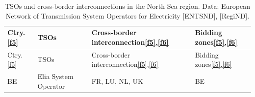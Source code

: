 \begin{longtable}[]{@{}llll@{}}
\caption{TSOs and cross-border interconnections in the North Sea region.
Data: European Network of Transmission System Operators for Electricity
{[}ENTSND{]}, {[}RegiND{]}.}\tabularnewline
\toprule
\begin{minipage}[b]{0.07\columnwidth}\raggedright
Ctry.\protect\hyperlink{f5}{{[}f5{]}}\strut
\end{minipage} & \begin{minipage}[b]{0.37\columnwidth}\raggedright
TSOs\strut
\end{minipage} & \begin{minipage}[b]{0.22\columnwidth}\raggedright
Cross-border
interconnection\protect\hyperlink{f5}{{[}f5{]}},\protect\hyperlink{f6}{{[}f6{]}}\strut
\end{minipage} & \begin{minipage}[b]{0.22\columnwidth}\raggedright
Bidding
zones\protect\hyperlink{f5}{{[}f5{]}},\protect\hyperlink{f6}{{[}f6{]}}\strut
\end{minipage}\tabularnewline
\midrule
\endfirsthead
\toprule
\begin{minipage}[b]{0.07\columnwidth}\raggedright
Ctry.\protect\hyperlink{f5}{{[}f5{]}}\strut
\end{minipage} & \begin{minipage}[b]{0.37\columnwidth}\raggedright
TSOs\strut
\end{minipage} & \begin{minipage}[b]{0.22\columnwidth}\raggedright
Cross-border
interconnection\protect\hyperlink{f5}{{[}f5{]}},\protect\hyperlink{f6}{{[}f6{]}}\strut
\end{minipage} & \begin{minipage}[b]{0.22\columnwidth}\raggedright
Bidding
zones\protect\hyperlink{f5}{{[}f5{]}},\protect\hyperlink{f6}{{[}f6{]}}\strut
\end{minipage}\tabularnewline
\midrule
\endhead
\begin{minipage}[t]{0.07\columnwidth}\raggedright
BE\strut
\end{minipage} & \begin{minipage}[t]{0.37\columnwidth}\raggedright
Elia System Operator\strut
\end{minipage} & \begin{minipage}[t]{0.22\columnwidth}\raggedright
FR, LU, NL, UK\strut
\end{minipage} & \begin{minipage}[t]{0.22\columnwidth}\raggedright
BE\strut
\end{minipage}\tabularnewline

\end{longtable}
